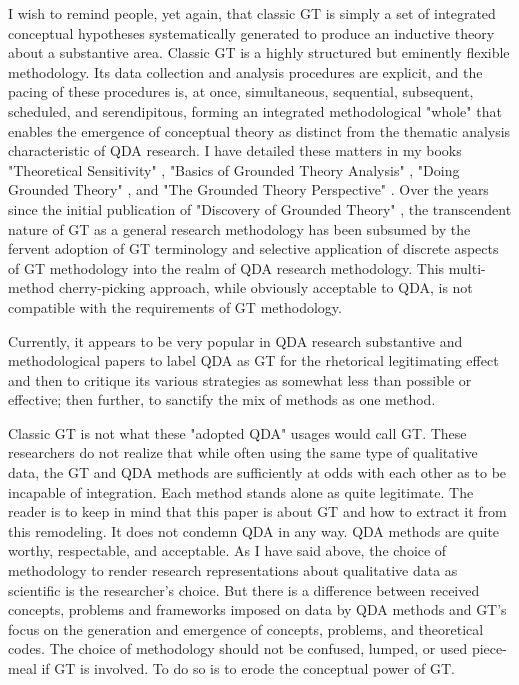I wish to remind people, yet again, that classic GT is simply a set of integrated conceptual hypotheses systematically generated to produce an inductive theory about a substantive area. 
Classic GT is a highly structured but eminently flexible methodology. 
Its data collection and analysis procedures are explicit, and the pacing of these procedures is, at once, simultaneous, sequential, subsequent, scheduled, and serendipitous, forming an integrated methodological "whole" that enables the emergence of conceptual theory as distinct from the thematic analysis characteristic of QDA research. 
I have detailed these matters in my books "Theoretical Sensitivity" 
\citep{book.glaser98a},
"Basics of Grounded Theory Analysis" 
\citep{book.glaser92},
"Doing Grounded Theory" 
\citep{book.glaser98b},
and "The Grounded Theory Perspective" 
\citep{book.glaser01}.
Over the years since the initial publication of "Discovery of Grounded Theory" 
\citep{book.glaser67},
the transcendent nature of GT as a general research methodology has been subsumed by the fervent adoption of GT terminology and selective application of discrete aspects of GT methodology into the realm of QDA research methodology. 
This multi-method cherry-picking approach, while obviously
acceptable to QDA, is not compatible with the requirements of GT methodology.

Currently, it appears to be very popular in QDA research substantive and
methodological papers to label QDA as GT for the rhetorical legitimating effect and then to critique its various strategies as somewhat less than possible or effective; then further, to sanctify the mix of methods as one method. 

Classic GT is not what these "adopted QDA" usages would call GT. 
These researchers do not realize that while often using the same type of qualitative data, the GT and QDA methods are sufficiently at odds with each other as to be incapable of integration. 
Each method stands alone as quite legitimate. 
The reader is to keep in mind that this paper is about GT and how to extract it from this remodeling. 
It does not condemn QDA in any way. QDA methods are quite worthy, respectable, and acceptable. 
As I have said above, the choice of methodology to render research representations about qualitative data as scientific is the researcher’s choice. 
But there is a difference between received concepts, problems and
frameworks imposed on data by QDA methods and GT’s focus on the
generation and emergence of concepts, problems, and theoretical codes. 
The choice of methodology should not be confused, lumped, or used piece-meal if GT is involved. 
To do so is to erode the conceptual power of GT.

